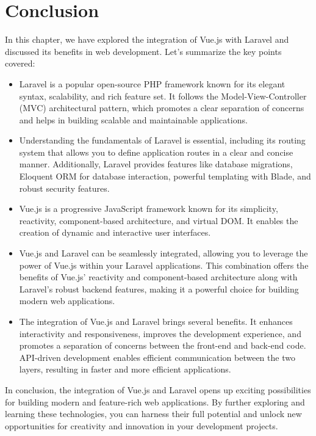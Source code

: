 \section{Conclusion}
In this chapter, we have explored the integration of Vue.js with Laravel and discussed its benefits in web development. Let's summarize the key points covered:
\begin{itemize}
    
    \item Laravel is a popular open-source PHP framework known for its elegant syntax, scalability, and rich feature set. It follows the Model-View-Controller (MVC) architectural pattern, which promotes a clear separation of concerns and helps in building scalable and maintainable applications.
    
    \item Understanding the fundamentals of Laravel is essential, including its routing system that allows you to define application routes in a clear and concise manner. Additionally, Laravel provides features like database migrations, Eloquent ORM for database interaction, powerful templating with Blade, and robust security features.
    
    \item Vue.js is a progressive JavaScript framework known for its simplicity, reactivity, component-based architecture, and virtual DOM. It enables the creation of dynamic and interactive user interfaces.
    
    \item Vue.js and Laravel can be seamlessly integrated, allowing you to leverage the power of Vue.js within your Laravel applications. This combination offers the benefits of Vue.js' reactivity and component-based architecture along with Laravel's robust backend features, making it a powerful choice for building modern web applications.
    
    \item The integration of Vue.js and Laravel brings several benefits. It enhances interactivity and responsiveness, improves the development experience, and promotes a separation of concerns between the front-end and back-end code. API-driven development enables efficient communication between the two layers, resulting in faster and more efficient applications.
\end{itemize}
In conclusion, the integration of Vue.js and Laravel opens up exciting possibilities for building modern and feature-rich web applications. By further exploring and learning these technologies, you can harness their full potential and unlock new opportunities for creativity and innovation in your development projects.
